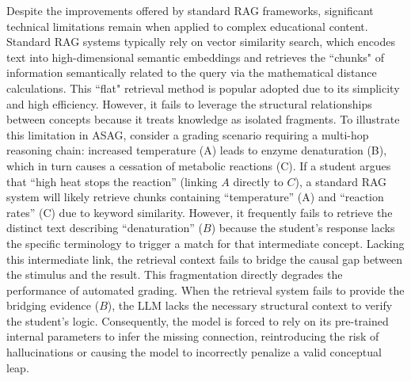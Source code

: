 \documentclass{edm_article}
\begin{document}
Despite the improvements offered by standard RAG frameworks, significant technical limitations remain when applied to complex educational content. Standard RAG systems typically rely on vector similarity search, which encodes text into high-dimensional semantic embeddings and retrieves the ``chunks" of information semantically related to the query via the mathematical distance calculations. This ``flat" retrieval method is popular adopted due to its simplicity and high efficiency. However, it fails to leverage the structural relationships between concepts because it treats knowledge as isolated fragments. To illustrate this limitation in ASAG, consider a grading scenario requiring a multi-hop reasoning chain: increased temperature (A) leads to enzyme denaturation (B), which in turn causes a cessation of metabolic reactions (C). If a student argues that ``high heat stops the reaction'' (linking $A$ directly to $C$), a standard RAG system will likely retrieve chunks containing ``temperature'' (A) and ``reaction rates'' (C) due to keyword similarity. However, it frequently fails to retrieve the distinct text describing ``denaturation'' ($B$) because the student's response lacks the specific terminology to trigger a match for that intermediate concept. Lacking this intermediate link, the retrieval context fails to bridge the causal gap between the stimulus and the result.
This fragmentation directly degrades the performance of automated grading. When the retrieval system fails to provide the bridging evidence ($B$), the LLM lacks the necessary structural context to verify the student's logic. Consequently, the model is forced to rely on its pre-trained internal parameters to infer the missing connection, reintroducing the risk of hallucinations or causing the model to incorrectly penalize a valid conceptual leap.
\end{document}
